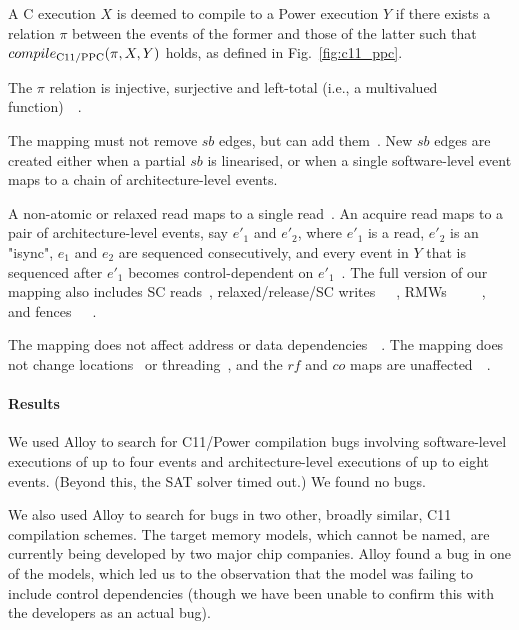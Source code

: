 \label{sec:Q4_c11_ppc}
A C execution $X$ is deemed to compile to a Power execution $Y$ if
there exists a relation $\pi$ between the events of the former and
those of the latter such that $compile_{\rm C11/PPC}(\pi,X,Y)$ holds,
as defined in Fig.~\ref{fig:c11_ppc}.

The $\pi$ relation is injective, surjective and left-total (i.e., a
multivalued function)~~. 

The mapping must not remove $sb$ edges, but can add
them~. New $sb$ edges are created either when a
partial $sb$ is linearised, or when a single software-level event maps
to a chain of architecture-level events.

A non-atomic or relaxed read maps to a single
read~. An acquire read maps to a pair of
architecture-level events, say $e'_1$ and $e'_2$, where $e'_1$ is a
read, $e'_2$ is an "isync", $e_1$ and $e_2$ are sequenced
consecutively, and every event in $Y$ that is sequenced after $e'_1$
becomes control-dependent on $e'_1$~. The full
version of our mapping also includes SC reads~,
relaxed/release/SC
writes~~~,
RMWs~~~~~,
and
fences~~~.

The mapping does not affect address or data
dependencies~~.  The mapping
does not change locations~ or
threading~, and the $rf$ and $co$ maps are
unaffected~~.

\paragraph{Results} We used Alloy to search for C11/Power compilation
bugs involving software-level executions of up to four events and
architecture-level executions of up to eight events. (Beyond this, the
SAT solver timed out.) We found no bugs.

We also used Alloy to search for bugs in two other, broadly similar,
C11 compilation schemes. The target memory models, which cannot be
named, are currently being developed by two major chip companies.
Alloy found a bug in one of the models, which led us to the
observation that the model was failing to include control dependencies
(though we have been unable to confirm this with the developers as an
actual bug).

